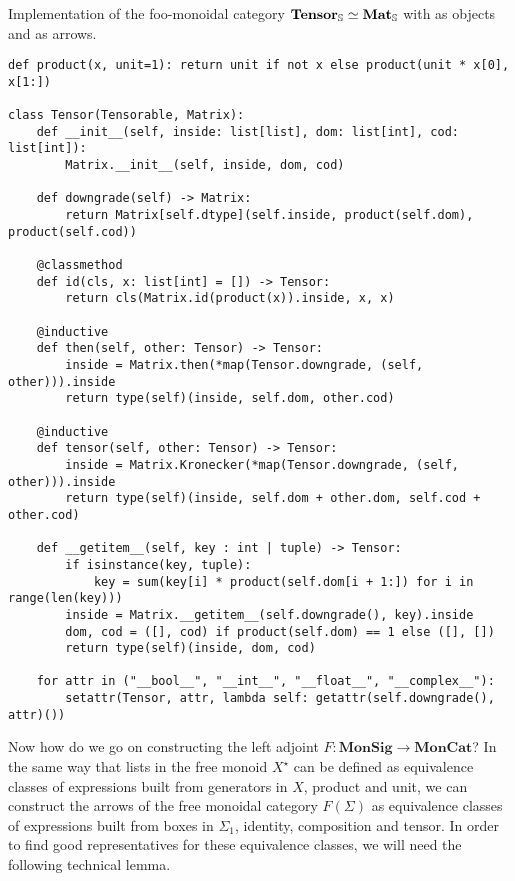 \begin{python}\label{listing:tensor}
{\normalfont Implementation of the foo-monoidal category $\mathbf{Tensor}_\S \simeq \mathbf{Mat}_\S$ with  as objects and  as arrows.}

\begin{verbatim}
def product(x, unit=1): return unit if not x else product(unit * x[0], x[1:])

class Tensor(Tensorable, Matrix):
    def __init__(self, inside: list[list], dom: list[int], cod: list[int]):
        Matrix.__init__(self, inside, dom, cod)

    def downgrade(self) -> Matrix:
        return Matrix[self.dtype](self.inside, product(self.dom), product(self.cod))

    @classmethod
    def id(cls, x: list[int] = []) -> Tensor:
        return cls(Matrix.id(product(x)).inside, x, x)

    @inductive
    def then(self, other: Tensor) -> Tensor:
        inside = Matrix.then(*map(Tensor.downgrade, (self, other))).inside
        return type(self)(inside, self.dom, other.cod)

    @inductive
    def tensor(self, other: Tensor) -> Tensor:
        inside = Matrix.Kronecker(*map(Tensor.downgrade, (self, other))).inside
        return type(self)(inside, self.dom + other.dom, self.cod + other.cod)

    def __getitem__(self, key : int | tuple) -> Tensor:
        if isinstance(key, tuple):
            key = sum(key[i] * product(self.dom[i + 1:]) for i in range(len(key)))
        inside = Matrix.__getitem__(self.downgrade(), key).inside
        dom, cod = ([], cod) if product(self.dom) == 1 else ([], [])
        return type(self)(inside, dom, cod)

    for attr in ("__bool__", "__int__", "__float__", "__complex__"):
        setattr(Tensor, attr, lambda self: getattr(self.downgrade(), attr)())
\end{verbatim}
\end{python}

Now how do we go on constructing the left adjoint $F : \mathbf{MonSig} \to \mathbf{MonCat}$?
In the same way that lists in the free monoid $X^\star$ can be defined as equivalence classes of expressions built from generators in $X$, product and unit, we can construct the arrows of the free monoidal category $F(\Sigma)$ as equivalence classes of expressions built from boxes in $\Sigma_1$, identity, composition and tensor.
In order to find good representatives for these equivalence classes, we will need the following technical lemma.

